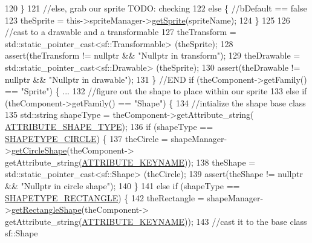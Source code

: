 \begin{DoxyCode}
120                 \}
121                 \textcolor{comment}{//else, grab our sprite TODO: checking}
122                 \textcolor{keywordflow}{else} \{ \textcolor{comment}{//bDefault == false}
123                     theSprite = this->spriteManager->\hyperlink{class_sprite_manager_a8473bca1fad87ad11cb2249eb810889e}{getSprite}(spriteName);
124                 \}
125 
126                 \textcolor{comment}{//cast to a drawable and a transformable}
127                 theTransform = std::static\_pointer\_cast<sf::Transformable> (theSprite);
128                 assert(theTransform != \textcolor{keyword}{nullptr} && \textcolor{stringliteral}{"Nullptr in transform"});
129                 theDrawable = std::static\_pointer\_cast<sf::Drawable> (theSprite);
130                 assert(theDrawable != \textcolor{keyword}{nullptr} && \textcolor{stringliteral}{"Nullptr in drawable"});
131             \} \textcolor{comment}{//END if (theComponent->getFamily() == "Sprite") \{ ...}
132             \textcolor{comment}{//figure out the shape to place within our sprite}
133             \textcolor{keywordflow}{else} \textcolor{keywordflow}{if} (theComponent->getFamily() == \textcolor{stringliteral}{"Shape"}) \{
134                 \textcolor{comment}{//intialize the shape base class}
135                 std::string shapeType = theComponent->getAttribute\_string(
      \hyperlink{_a_e___attributes_8h_a4f8798cc305e537725c57bb8f47ba740}{ATTRIBUTE\_SHAPE\_TYPE});
136                 \textcolor{keywordflow}{if} (shapeType == \hyperlink{_a_e___attributes_8h_ab5acdc705507cd35bfe5a25d403aaef7}{SHAPETYPE\_CIRCLE}) \{
137                     theCircle = shapeManager->\hyperlink{class_shape_manager_a7767defde1e2e295054cbe7e0084b0f7}{getCircleShape}(theComponent->
      getAttribute\_string(\hyperlink{_a_e___attributes_8h_a38d48cad306c55d90faa362aa5023de8}{ATTRIBUTE\_KEYNAME}));
138                     theShape = std::static\_pointer\_cast<sf::Shape> (theCircle);
139                     assert(theShape != \textcolor{keyword}{nullptr} && \textcolor{stringliteral}{"Nullptr in circle shape"});
140                 \}
141                 \textcolor{keywordflow}{else} \textcolor{keywordflow}{if} (shapeType == \hyperlink{_a_e___attributes_8h_afcd66434a1fe0cb68cca8dbd87a596f9}{SHAPETYPE\_RECTANGLE}) \{
142                     theRectangle = shapeManager->\hyperlink{class_shape_manager_ae6db2abfe598532e3a04634377958bab}{getRectangleShape}(theComponent->
      getAttribute\_string(\hyperlink{_a_e___attributes_8h_a38d48cad306c55d90faa362aa5023de8}{ATTRIBUTE\_KEYNAME})); 
143                     \textcolor{comment}{//cast it to the base class sf::Shape}

\end{DoxyCode}
